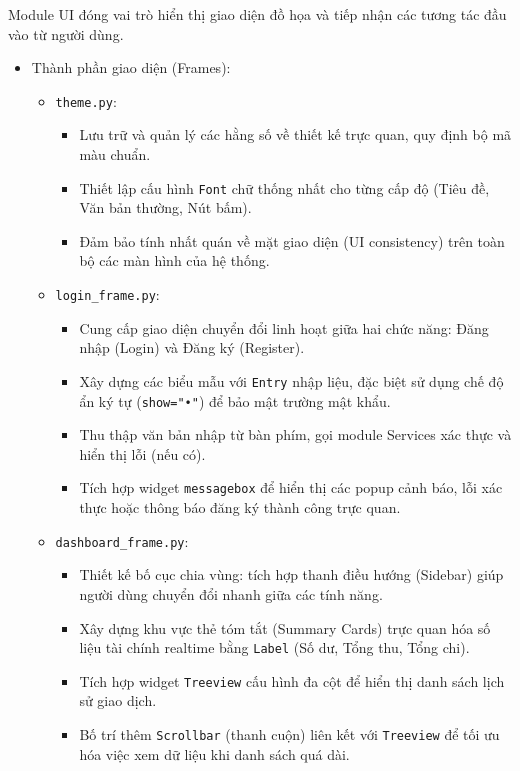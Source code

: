 \documentclass[12pt,letterpaper]{article}
\begin{document}
Module UI đóng vai trò hiển thị giao diện đồ họa và tiếp nhận các tương tác đầu vào từ người dùng.
\begin{itemize}
    \item Thành phần giao diện (Frames):
    \begin{itemize}
        \item \texttt{theme.py}:
        \begin{itemize}
            \item Lưu trữ và quản lý các hằng số về thiết kế trực quan, quy định bộ mã màu chuẩn.
            \item Thiết lập cấu hình \texttt{Font} chữ thống nhất cho từng cấp độ (Tiêu đề, Văn bản thường, Nút bấm).
            \item Đảm bảo tính nhất quán về mặt giao diện (UI consistency) trên toàn bộ các màn hình của hệ thống.
        \end{itemize}
        \item \texttt{login\_frame.py}:
        \begin{itemize}
            \item Cung cấp giao diện chuyển đổi linh hoạt giữa hai chức năng: Đăng nhập (Login) và Đăng ký (Register).
            \item Xây dựng các biểu mẫu với \texttt{Entry} nhập liệu, đặc biệt sử dụng chế độ ẩn ký tự (\texttt{show="•"}) để bảo mật trường mật khẩu.
            \item Thu thập văn bản nhập từ bàn phím, gọi module Services xác thực và hiển thị lỗi (nếu có).
            \item Tích hợp widget \texttt{messagebox} để hiển thị các popup cảnh báo, lỗi xác thực hoặc thông báo đăng ký thành công trực quan.
        \end{itemize}
        \item \texttt{dashboard\_frame.py}:
        \begin{itemize}
            \item Thiết kế bố cục chia vùng: tích hợp thanh điều hướng (Sidebar) giúp người dùng chuyển đổi nhanh giữa các tính năng.
            \item Xây dựng khu vực thẻ tóm tắt (Summary Cards) trực quan hóa số liệu tài chính realtime bằng \texttt{Label} (Số dư, Tổng thu, Tổng chi).
            \item Tích hợp widget \texttt{Treeview} cấu hình đa cột để hiển thị danh sách lịch sử giao dịch.
            \item Bố trí thêm \texttt{Scrollbar} (thanh cuộn) liên kết với \texttt{Treeview} để tối ưu hóa việc xem dữ liệu khi danh sách quá dài.

\end{itemize}
\end{itemize}
\end{itemize}
\end{document}
